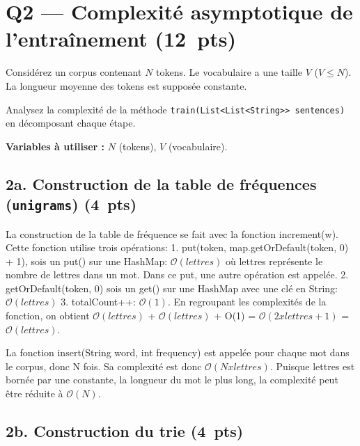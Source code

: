 \documentclass[12pt,a4paper]{article}
\newcommand{\pts}[1]{\hfill\textbf{\small(#1~pts)}}
\newcommand{\bigo}[1]{$\mathcal{O}(#1)$}
\begin{document}
\newpage

\section{Q2 — Complexité asymptotique de l'entraînement \pts{12}}

Considérez un corpus contenant $N$ tokens. Le vocabulaire a une taille $V$
($V \leq N$). La longueur moyenne des tokens est supposée constante.

Analysez la complexité de la méthode \texttt{train(List<List<String>> sentences)}
en décomposant chaque étape.

\textbf{Variables à utiliser :} $N$ (tokens), $V$ (vocabulaire).

\subsection*{2a. Construction de la table de fréquences (\texttt{unigrams}) \pts{4}}

La construction de la table de fréquence se fait avec la fonction increment(w). Cette fonction
utilise trois opérations: 1. put(token, map.getOrDefault(token, 0) + 1), sois un put() sur une HashMap: \bigo{lettres}
où lettres représente le nombre de lettres dans un mot. Dans ce put, une autre opération est appelée.
2. getOrDefault(token, 0) sois un get() sur une HashMap avec une clé en String: \bigo{lettres} 3. totalCount++: \bigo{1}.
En regroupant les complexités de la fonction, on obtient
\bigo{lettres} + \bigo{lettres} + O(1) = \bigo{2 x lettres + 1} = \bigo{lettres}.

La fonction insert(String word, int frequency) est appelée pour chaque mot dans le corpus, donc N fois.
Sa complexité est donc \bigo{N x lettres}. Puisque lettres est bornée par une constante, la longueur du mot le plus
long, la complexité peut être réduite à \bigo{N}.

\subsection*{2b. Construction du trie \pts{4}}
\end{document}
